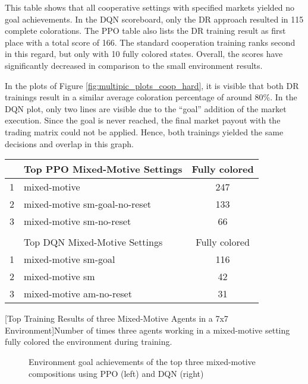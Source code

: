 This table shows that all cooperative settings with specified markets yielded no goal achievements. In the DQN scoreboard, only the DR approach resulted in 115 complete colorations. The PPO table also lists the DR training result as first place with a total score of 166. The standard cooperation training ranks second in this regard, but only with 10 fully colored states. Overall, the scores have significantly decreased in comparison to the small environment results.

In the plots of Figure \ref{fig:multipic_plots_coop_hard}, it is visible that both DR trainings result in a similar average coloration percentage of around 80\%. In the DQN plot, only two lines are visible due to the ``goal'' addition of the market execution. Since the goal is never reached, the final market payout with the trading matrix could not be applied. Hence, both trainings yielded the same decisions and overlap in this graph. 

\begin{center}
\begin{tabular}{clc}\hline
      & Top PPO Mixed-Motive Settings & Fully colored \\ \hline
    {\small 1} & mixed-motive & 247 \\
    {\small 2} & mixed-motive sm-goal-no-reset & 133 \\
    {\small 3} & mixed-motive sm-no-reset & 66 \\ \hline
      &   \\ \hline
      & Top DQN Mixed-Motive Settings & Fully colored \\ \hline
    {\small 1} & mixed-motive sm-goal & 116 \\
    {\small 2} & mixed-motive sm & 42 \\
    {\small 3} & mixed-motive am-no-reset & 31 \\ \hline
    \end{tabular}
    [Top Training Results of three Mixed-Motive Agents in a 7x7 Environment]{Number of times three agents working in a mixed-motive setting fully colored the environment during training.}\label{t:3-mixed-hard}
\end{center}

\begin{figure}[hpbt]
    \centering
    \hspace{0.01\textwidth}
    \caption[Plots of fully coloration achievements of the Top Mixed-Motive Modes in a 7x7 Environment]{Environment goal achievements of the top three mixed-motive compositions using PPO (left) and DQN (right)}
    \label{fig:multipic_plots_mixed_hard}
\end{figure}


